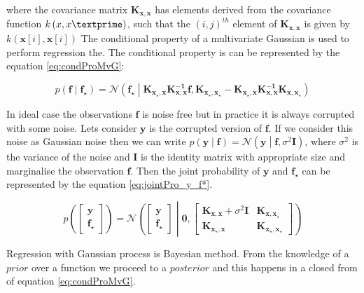 where the covariance matrix $ \mathbf{K_{x,x}}$ has elements derived from the covariance function $ k \left(x,x\textprime \right)$, such that the $ \left(i,j \right)^{th}$ element of $ \mathbf{K_{x,x}}$ is
given by $k \left( \mathbf{x} \left[ i\right],\mathbf{x} \left[ i\right] \right) $ The conditional property of a multivariate Gaussian is used to perform regression the. The conditional property is can be represented by the equation \ref{eq:condProMvG}: 

\begin{equation} \label{eq:condProMvG}
p \left( \mathbf{f} \middle| \mathbf{f_\star} \right) =
\mathcal{N}\left( \mathbf{f_\star} \middle| \mathbf{K_{x_\star,x}}  \mathbf{K^{-1}_{x,x}} \mathbf{f,} \mathbf{K_{x_\star,x_\star}} - 
\mathbf{K_{x_\star,x}} \mathbf{K^{-1}_{x,x}} \mathbf{K_{x,x_\star}}\right)
\end{equation}

In ideal case the observations $\mathbf{f}$ is noise free but in practice it is always corrupted with some noise. Lets consider $\mathbf{y}$ is the corrupted version of $\mathbf{f}$. If we consider this noise as Gaussian noise then we can write $p \left( \mathbf{y} \middle| \mathbf{f} \right) = \mathcal{N} \left( \mathbf{y} \middle| \mathbf{f}, \sigma^2 \mathbf{I} \right) $, where $ \sigma^2 $ is the variance of the noise and $\mathbf{I}$ is the identity matrix with appropriate size and marginalise the observation $\mathbf{f}$. Then the joint probability of $\mathbf{y}$ and $\mathbf{f_\star}$ can be represented by the equation \ref{eq:jointPro_y_f*}.

\begin{equation} \label{eq:jointPro_y_f*}
p \left( \begin{bmatrix} \mathbf{y} \\\mathbf{f_\star} \end{bmatrix} \right) =
\mathcal{N}\left( \begin{bmatrix} \mathbf{y} \\\mathbf{f_\star} \end{bmatrix} \middle|
\mathbf{0}, \begin{bmatrix} \mathbf{K_{x,x}}+ \sigma^2\mathbf{I} & \mathbf{K_{x,x_\star}} \\
			    \mathbf{K_{x_\star,x}} & \mathbf{K_{x_\star,x_\star}} \end{bmatrix} \right)
\end{equation}

Regression with Gaussian process is Bayesian method. From the knowledge of a $prior$ over a function we proceed to a $posterior$ and this happens in a closed from of equation \ref{eq:condProMvG}. 


